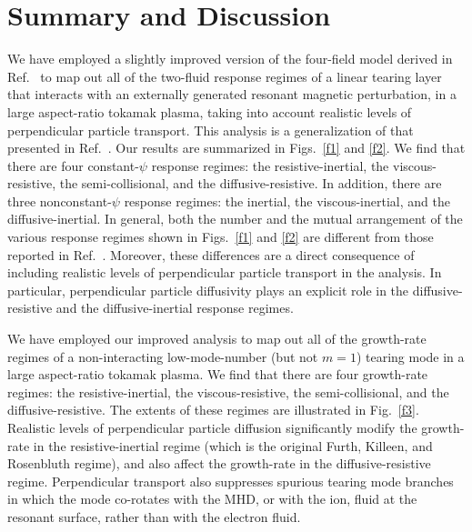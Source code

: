 \documentclass[12pt,prb,aps]{revtex4-1}
\providecommand{\DIFaddend}{} %
\begin{document}
\DIFaddend \section{Summary and Discussion}
We have employed a slightly improved version of the four-field model derived in Ref.~ to map out  all of the
two-fluid response regimes of a  linear tearing layer that interacts with an externally generated resonant magnetic perturbation,  in a large aspect-ratio tokamak plasma, 
taking into account realistic levels of perpendicular particle transport. This analysis is a generalization of that
presented in Ref.~. Our results are summarized in Figs.~\ref{f1} and
\ref{f2}. We find that there are four constant-$\psi$ response regimes: the resistive-inertial, the viscous-resistive, the
semi-collisional, and the diffusive-resistive. In addition, there are three nonconstant-$\psi$ response regimes: the inertial, the
viscous-inertial, and the diffusive-inertial. In general, both the number and the mutual arrangement of the various response regimes shown
in Figs.~\ref{f1} and \ref{f2} are different from those reported in Ref.~. Moreover, these differences are a direct 
consequence of including realistic levels of perpendicular particle transport in the analysis. In particular, perpendicular particle
diffusivity plays an explicit role in the diffusive-resistive and the diffusive-inertial response regimes. 

We have employed our improved analysis to map out all of the growth-rate regimes of a non-interacting low-mode-number
(but not $m=1$) tearing mode in a large aspect-ratio tokamak plasma. We find that there are four growth-rate regimes:
the resistive-inertial, the viscous-resistive, the semi-collisional, and the diffusive-resistive. The extents of these regimes are illustrated in Fig.~\ref{f3}. 
Realistic levels of perpendicular particle diffusion significantly modify the growth-rate in the resistive-inertial
regime (which is the original Furth, Killeen, and Rosenbluth regime), and also affect the growth-rate in the diffusive-resistive regime. 
Perpendicular transport also suppresses spurious tearing mode branches in which the mode co-rotates with the MHD, or with the ion,
fluid at the resonant surface, rather than with the electron fluid. 
\end{document}
